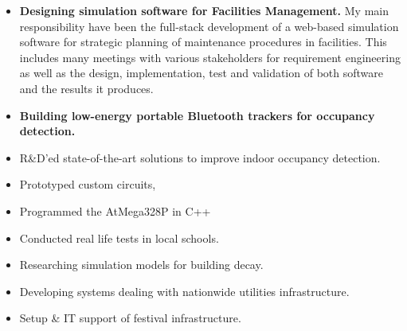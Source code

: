 \begin{itemize}
\item \textbf{Designing simulation software for Facilities Management.}
My main responsibility have been the full-stack development of a web-based simulation software for strategic planning of maintenance procedures in facilities.
This includes many meetings with various stakeholders for requirement engineering as well as the design, implementation, test and validation of both software and the results it produces.
\end{itemize}

\divider

\begin{itemize}
	\item \textbf{Building low-energy portable Bluetooth trackers for occupancy detection.}
	\item R\&D'ed state-of-the-art solutions to improve indoor occupancy detection.
	\item Prototyped custom circuits, 
	\item Programmed the AtMega328P in C++
	\item Conducted real life tests in local schools.  
\end{itemize}

\divider



\begin{itemize}
	\item Researching simulation models for building decay. 
\end{itemize}

\divider


\begin{itemize}
	\item Developing systems dealing with nationwide utilities infrastructure. 
\end{itemize}

\divider

\begin{itemize}
	\item Setup \& IT support of festival infrastructure.
\end{itemize}
